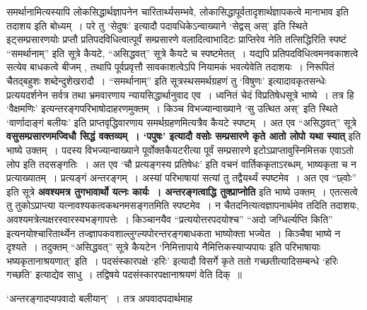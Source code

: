 समर्थानामित्यस्यापि लोकसिद्धार्थज्ञापनेन चारितार्थ्यसम्भवे, लोकासिद्धापूर्वतादृशार्थज्ञापकत्वे मानाभाव इति तदाशय इति बोध्यम्~।
परे तु `सेदुषः' इत्यादौ पदावधिकेऽन्वाख्याने `सेद्वस् अस्' इति स्थिते इट्‍सम्प्रसारणयोः प्रप्तौ प्रतिपदविधित्वात्पूर्वं सम्प्रसारणे वलादित्वाभादिटः प्राप्तिरेव नेति तत्सिद्धिरिति स्पष्टं ``समर्थानाम्'' इति सूत्रे कैयटे, ``असिद्धवत्'' सूत्रे कैयटे च स्पष्टमेतत्~।
यद्यपि प्रतिपदविधित्वमनवकाशत्वे सत्येव बाधकत्वे बीजम् , तथापि पूर्वप्रवृत्तौ सावकाशत्वेऽपि नियामकं भवत्येवेति तदाशयः~।
निरूपितं चैतद्बहुशः शब्देन्दुशेखरादौ~।
 ``समर्थानाम्'' इति सूत्रस्थसमर्थग्रहणं तु `विषुणः' इत्यादावकृतसन्धेः प्रत्ययदर्शनेन सर्वत्र तथा भ्रमवारणाय न्यायसिद्धार्थानुवाद एव~।
ध्वनितं चेदं विप्रतिषेधसूत्रे भाष्ये~।
तत्र हि `वैक्षमणिः' इत्यन्तरङ्गपरिभाषोदाहरणमुक्तम्~।
किञ्च विभज्यान्वाख्याने `सु उत्थित अस्' इति स्थिते `वार्णादाङ्गं बलीयः' इति प्राप्तवृद्धिवारणाय समर्थग्रहणमित्यत्रैव कैयटे स्पष्टम्~।
अत एव ``असिद्धवत्'' सूत्रे {\bfseries वसुसम्प्रसारणमज्विधौ सिद्धं वक्तव्यम्~। `पपुषः' इत्यादौ वसोः सम्प्रसारणे कृते आतो लोपो यथा स्यात्} इति भाष्ये उक्तम्~।
पदस्य विभज्यान्वाख्याने पूर्वोक्तकैयटरीत्या पूर्वं सम्प्रसारणे इटोऽप्राप्तावुस्निमित्तक एवाऽतो लोप इति तदसङ्गतिः~।
अत एव `चौ प्रत्यङ्गस्य प्रतिषेधः' इति वचनं वार्तिककृताऽरब्धम्, भाष्यकृता च न प्रत्याख्यातम्~।
प्रत्यङ्गं अन्तरङ्गम्~।
अस्यां परिभाषायां सत्यां तु तद्वैयर्थ्यं स्पष्टमेव~।
अत एव ``छ्वोः'' इति सूत्रे {\bfseries अवश्यमत्र तुगभावार्थो यत्नः कार्यः~। अन्तरङ्गत्वाद्धि तुक्प्राप्नोति} इति भाष्ये उक्तम्~।
एतत्सत्वे तु तुकोऽप्राप्त्या यत्नावश्यकत्वकथनमसङ्गतमिति स्पष्टमेव~।
न चैतदनित्यत्वज्ञापनार्थमेव तदिति तदाशयः, अवश्यमत्रेत्यक्षरस्वारस्यभङ्गापत्तेः~।
किञ्चानयैव ``प्रत्ययोत्तरपदयोश्च'' ``अदो जग्धिर्ल्यप्ति किति'' इत्यनयोश्चारितार्थ्येन तज्ज्ञापकवशाल्लुग्ल्यपोरन्तरङ्गबाधकता भाष्योक्ता भज्येत~।
किञ्चैषा भाष्ये न दृश्यते~।
तदुक्तम् ``असिद्धवत्'' सूत्रे कैयटेन `निमित्तापाये नैमित्तिकस्याप्यपायः इति परिभाषायाः भष्यकृतानाश्रयणात्' इति~।
पदसंस्कारपक्षे `हरिः' इत्यादौ विसर्गे कृते ततो गच्छतीत्यादिसम्बन्धे `हरिः गच्छति' इत्याद्येव साधु~।
तद्विषये पदसंस्कारपक्षानाश्रयणं वेति दिक्~॥\par
`अन्तरङ्गादप्यपवादो बलीयान्'~।
तत्र अपवादपदार्थमाह
